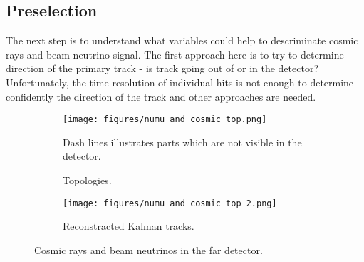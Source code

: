 \subsection{Preselection} \label{presel}
The next step is to understand what variables could help to descriminate cosmic rays and beam neutrino
signal. The first approach here is to try to determine direction of the primary track - is track going 
out of or in the detector? Unfortunately, the time resolution of individual hits is not enough to determine 
confidently the direction of the track and other approaches are needed. 
\begin{figure}[h]
\begin{subfigure}[t]{0.9\textwidth}
  \centering
  \texttt{[image: figures/numu\_and\_cosmic\_top.png]}
  \caption{Topologies.}
  {Dash lines illustrates parts which are not visible in the detector.}
  \label{fig:cosmic_top}
\end{subfigure}
\vspace{0.5cm}
\newline
\begin{subfigure}[t]{0.9\textwidth}
  \centering
  \texttt{[image: figures/numu\_and\_cosmic\_top\_2.png]}
  \caption{Reconstracted Kalman tracks.}
  \label{fig:cosmic_top_2}
\end{subfigure}
\caption{Cosmic rays and beam neutrinos in the far detector.}
\label{fig:top_and_reco_tracks}
\end{figure}

